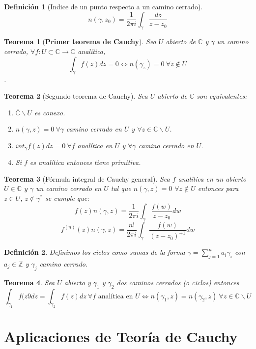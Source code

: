 \documentclass[10pt]{book}
\newtheorem{defi}{Definición}[chapter]
\newtheorem{theorem}{Teorema}[chapter]
\newcommand{\C}{\mathbb{C}}
\newcommand{\Z}{\mathbb{Z}}
\newcommand{\f}{f: U\subset \C \longrightarrow \C}
\begin{document}
\begin{defi}[Indice de un punto respecto a un camino cerrado]
$$n(\gamma,z_0) = \frac{1}{2\pi i}\int_\gamma \frac{dz}{z-z_0}$$
\end{defi}


\begin{theorem}[\textbf{Primer teorema de Cauchy}]
Sea $U$ abierto de $\C$ y $\gamma$ un camino cerrado, $\forall \f$ analítica, $$\int_\gamma f(z)dz = 0 \Leftrightarrow n(\gamma_z)=0 \ \forall z \notin U$$.
\end{theorem} 
\begin{theorem}[Segundo teorema de Cauchy]
Sea $U$ abierto de $\C$ son equivalentes:
\begin{enumerate}
\item $\overline{\C}\backslash U$ es conexo.
\item $n(\gamma,z)=0 \ \forall \gamma$ camino cerrado en $U$ y $\forall z \in \C\backslash U$.
\item $int_\gamma f(z)dz = 0 \ \forall f$ analítica en $U$ y $\forall \gamma$ camino cerrado en $U$.
\item Si $f$ es analítica entonces tiene primitiva.
\end{enumerate}
\end{theorem}


\begin{theorem}[Fórmula integral de Cauchy general]
Sea $f$ analítica en un abierto $U\in\C$ y $\gamma$ un camino cerrado en $U$ tal que $n(\gamma,z)=0$ $\forall z \notin U$ entonces para $z \in U$, $z \notin\gamma^*$ se cumple que:
$$f(z)n(\gamma,z) = \frac{1}{2\pi i}\int_\gamma \frac{f(w)}{z-z_0}dw$$
$$f^{(n)}(z)n(\gamma,z) = \frac{n!}{2\pi i}\int_\gamma \frac{f(w)}{(z-z_0)^{+1}}dw$$
\end{theorem}

\begin{defi}
Definimos los ciclos como sumas de la forma $\gamma = \sum_{j=1}^n a_i\gamma_i$ con $a_j \in\Z$ y $\gamma_j$ camino cerrado.
\end{defi}

\begin{theorem}
Sea $U$ abierto y $\gamma_1$ y $\gamma_2$ dos caminos cerrados (o ciclos) entonces
$$\int_{\gamma_1} f(z9dz = \int_{\gamma_2} f(z)dz\ \forall f \text{ analítica en }U \Leftrightarrow n(\gamma_1,z) = n(\gamma_2,z) \ \forall z\in \C\backslash U$$
\end{theorem}

\section{Aplicaciones de Teoría de Cauchy}
\end{document}
